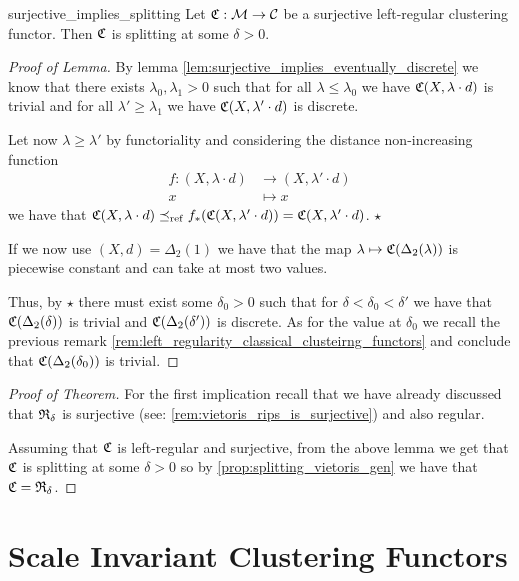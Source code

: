 \begin{lemma}{}{surjective_implies_splitting}
    Let $\mathfrak{C}: \mathcal{M} \to \mathcal{C}$ be a surjective left-regular clustering functor. Then $\mathfrak{C}$ is splitting at some $\delta > 0$.

\end{lemma}

\begin{proof}[Proof of Lemma]
    By lemma \ref{lem:surjective_implies_eventually_discrete} we know that there exists $\lambda_0, \lambda_1 > 0$ such that for all $\lambda \le \lambda_0$ we have $\mathfrak{C}(X, \lambda \cdot d)$ is trivial and for all $\lambda' \ge \lambda_1$ we have $\mathfrak{C}(X, \lambda' \cdot d)$ is discrete.

    Let now $\lambda \ge \lambda'$ by functoriality and considering the distance non-increasing function
    \begin{align*}
        f: (X, \lambda \cdot d) &\longrightarrow (X, \lambda' \cdot d)\\
        x &\longmapsto x
    \end{align*}
    we have that $\mathfrak{C}(X, \lambda \cdot d) \preceq_\mathrm{ref} f_*(\mathfrak{C}(X, \lambda' \cdot d)) = \mathfrak{C}(X, \lambda' \cdot d)$. $\star$

    If we now use $(X,d) = \Delta_2(1)$ we have that the map $\lambda \mapsto \mathfrak{C}(\Delta_2(\lambda))$ is piecewise constant and can take at most two values.

    Thus, by $\star$ there must exist some $\delta_0 > 0$ such that for $\delta < \delta_0 < \delta'$ we have that $\mathfrak{C}(\Delta_2(\delta))$ is trivial and $\mathfrak{C}(\Delta_2(\delta'))$ is discrete.
    As for the value at $\delta_0$ we recall the previous remark \ref{rem:left_regularity_classical_clusteirng_functors} and conclude that $\mathfrak{C}(\Delta_2(\delta_0))$ is trivial.
\end{proof}

\begin{proof}[Proof of Theorem]
    For the first implication recall that we have already discussed that $\mathfrak{R}_\delta$ is surjective (see: \ref{rem:vietoris_rips_is_surjective}) and also regular.

    Assuming that $\mathfrak{C}$ is left-regular and surjective, from the above lemma we get that $\mathfrak{C}$ is splitting at some $\delta > 0$ so by \ref{prop:splitting_vietoris_gen} we have that $\mathfrak{C} = \mathfrak{R}_{\delta}$.
\end{proof}

\section{Scale Invariant Clustering Functors}

